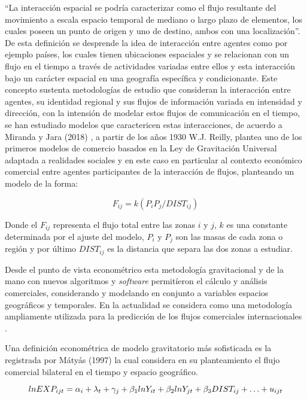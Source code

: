 \documentclass[
  spanish,
  twocolumn]{article}
\begin{document}
``La interacción espacial se podría caracterizar como el flujo
resultante del movimiento a escala espacio temporal de mediano o largo
plazo de elementos, los cuales poseen un punto de origen y uno de
destino, ambos con una localización''\autocite{miranda_aplicacion_2018}.
De esta definición se desprende la idea de interacción entre agentes
como por ejemplo países, los cuales tienen ubicaciones espaciales y se
relacionan con un flujo en el tiempo a través de actividades variadas
entre ellos y esta interacción bajo un carácter espacial en una
geografía específica y condicionante. Este concepto sustenta
metodologías de estudio que consideran la interacción entre agentes, su
identidad regional y sus flujos de información variada en intensidad y
dirección, con la intensión de modelar estos flujos de comunicación en
el tiempo, se han estudiado modelos que caractericen estas
interacciones, de acuerdo a Miranda y Jara (2018)
\autocite{miranda_aplicacion_2018}, a partir de los años 1930 W.J.
Reilly, plantea uno de los primeros modelos de comercio basados en la
Ley de Gravitación Universal adaptada a realidades sociales y en este
caso en particular al contexto económico comercial entre agentes
participantes de la interacción de flujos, planteando un modelo de la
forma:

\[
F_{ij} = k (P_i P_j/DIST_{ij})
\]

Donde el \(F_{ij}\) representa el flujo total entre las zonas \(i\) y
\(j\), \(k\) es una constante determinada por el ajuste del modelo,
\(P_i\) y \(P_j\) son las masas de cada zona o región y por último
\(DIST_{ij}\) es la distancia que separa las dos zonas a estudiar.

Desde el punto de vista econométrico esta metodología gravitacional y de
la mano con nuevos algoritmos y \emph{software} permitíeron el cálculo y
análisis comerciales, considerando y modelando en conjunto a variables
espacios geográficos y temporales. En la actualidad se considera como
una metodología ampliamente utilizada para la predicción de los flujos
comerciales internacionales \autocite{vallina-hernandez_gravity_2020}.

Una definición econométrica de modelo gravitatorio más sofisticada es la
registrada por Mátyás (1997) \autocite{matyas_proper_1997} la cual
considera en su planteamiento el flujo comercial bilateral en el tiempo
y espacio geográfico.

\[ 
\tiny ln EXP_{ijt}= \alpha_i+\lambda_t+\gamma_j+\beta_1 ln Y_{it}+\beta_2 ln Y_{jt}+\beta_3 DIST_{ij}+ \ldots+u_{ijt}
\]
\end{document}
